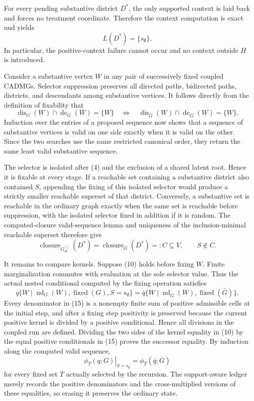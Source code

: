 For every pending substantive district \(D^{*}\), the only supported context is laid back and forces no treatment coordinate.  Therefore the context computation is exact and yields
\[
 L(D^{*})=\{s_{\emptyset}\}.
 \tag{12}
\]
In particular, the positive-context failure cannot occur and no context outside \(H\) is introduced.

Consider a substantive vertex \(W\) in any pair of successively fixed coupled CADMGs.  Selector suppression preserves all directed paths, bidirected paths, districts, and descendants among substantive vertices.  It follows directly from the definition of fixability that
\[
 \operatorname{dis}_{G}(W)\cap\operatorname{de}_{G}(W)=\{W\}
 \quad\Longleftrightarrow\quad
 \operatorname{dis}_{\bar G}(W)\cap\operatorname{de}_{\bar G}(W)=\{W\}.
 \tag{13}
\]
Induction over the entries of a proposed sequence now shows that a sequence of substantive vertices is valid on one side exactly when it is valid on the other.  Since the two searches use the same restricted canonical order, they return the same least valid substantive sequence.

The selector is isolated after (4) and the exclusion of a shared latent root.  Hence it is fixable at every stage.  If a reachable set containing a substantive district also contained \(S\), appending the fixing of this isolated selector would produce a strictly smaller reachable superset of that district.  Conversely, a substantive set is reachable in the ordinary graph exactly when the same set is reachable before suppression, with the isolated selector fixed in addition if it is random.  The computed-closure valid-sequence lemma and uniqueness of the inclusion-minimal reachable superset therefore give
\[
 \operatorname{closure}_{G_H^{[]}}(D^{*})
 =\operatorname{closure}_{\bar G}(D^{*})=:C\subseteq V,
 \qquad S\notin C.
 \tag{14}
\]

It remains to compare kernels.  Suppose (10) holds before fixing \(W\).  Finite marginalization commutes with evaluation at the sole selector value.  Thus the actual nested conditional computed by the fixing operation satisfies
\[
 q\{W\mid\operatorname{nd}_{G}(W),\operatorname{fixed}(G),S=s_{\emptyset}\}
 =
 \bar q\{W\mid\operatorname{nd}_{\bar G}(W),\operatorname{fixed}(\bar G)\}.
 \tag{15}
\]
Every denominator in (15) is a nonempty finite sum of positive admissible cells at the initial step, and after a fixing step positivity is preserved because the current positive kernel is divided by a positive conditional.  Hence all divisions in the coupled run are defined.  Dividing the two sides of the kernel equality in (10) by the equal positive conditionals in (15) proves the successor equality.  By induction along the computed valid sequence,
\[
 \left.
 \phi_T(q;G)
 \right|_{S=s_{\emptyset}}
 =
 \phi_T(\bar q;\bar G)
 \tag{16}
\]
for every fixed set \(T\) actually selected by the recursion.  The support-aware ledger merely records the positive denominators and the cross-multiplied versions of these equalities, so erasing it preserves the ordinary state.

